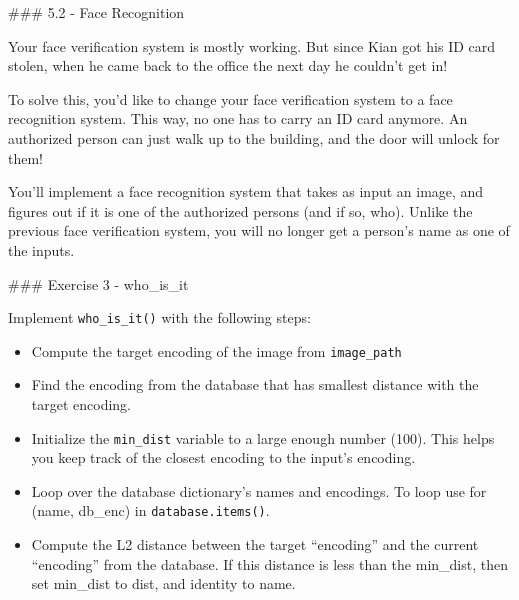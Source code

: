 \documentclass[11pt]{article}
\providecommand{\tightlist}{%
      \setlength{\itemsep}{0pt}\setlength{\parskip}{0pt}}
\begin{document}
    \#\#\# 5.2 - Face Recognition

Your face verification system is mostly working. But since Kian got his
ID card stolen, when he came back to the office the next day he couldn't
get in!

To solve this, you'd like to change your face verification system to a
face recognition system. This way, no one has to carry an ID card
anymore. An authorized person can just walk up to the building, and the
door will unlock for them!

You'll implement a face recognition system that takes as input an image,
and figures out if it is one of the authorized persons (and if so, who).
Unlike the previous face verification system, you will no longer get a
person's name as one of the inputs.

\#\#\# Exercise 3 - who\_is\_it

Implement \texttt{who\_is\_it()} with the following steps:

\begin{itemize}
\tightlist
\item
  Compute the target encoding of the image from \texttt{image\_path}
\item
  Find the encoding from the database that has smallest distance with
  the target encoding.
\item
  Initialize the \texttt{min\_dist} variable to a large enough number
  (100). This helps you keep track of the closest encoding to the
  input's encoding.
\item
  Loop over the database dictionary's names and encodings. To loop use
  for (name, db\_enc) in \texttt{database.items()}.
\item
  Compute the L2 distance between the target ``encoding'' and the
  current ``encoding'' from the database. If this distance is less than
  the min\_dist, then set min\_dist to dist, and identity to name.
\end{itemize}
\end{document}
